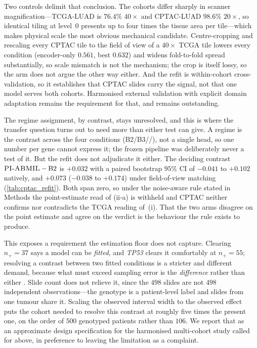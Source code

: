 Two controls delimit that conclusion. The cohorts differ sharply in scanner
magnification---TCGA-LUAD is $76.4\%$ $40\times$ and CPTAC-LUAD $98.6\%$
$20\times$, so identical tiling at level~$0$ presents up to four times the
tissue area per tile---which makes physical scale the most obvious mechanical
candidate. Centre-cropping and rescaling every CPTAC tile to the field of view
of a $40\times$ TCGA tile lowers every condition (encoder-only $0.561$, best
$0.632$) and widens fold-to-fold spread substantially, so scale mismatch is
not the mechanism; the crop is itself lossy, so the arm does not argue the
other way either. And the refit is within-cohort cross-validation, so it
establishes that CPTAC slides carry the signal, not that one model serves both
cohorts. Harmonised external validation with explicit domain adaptation
remains the requirement for that, and remains outstanding.

The regime assignment, by contrast, stays unresolved, and this is where the
transfer question turns out to need more than either test can give. A regime
is the contrast across the four conditions (B2/B3/\piabmil{}/\fcmil{}), not a
single head, so one number per gene cannot express it; the frozen pipeline was
deliberately never a test of it. But the refit does not adjudicate it either.
The deciding contrast $\textsc{PI-ABMIL}{}-\mathrm{B2}$ is $+0.032$ with a paired
bootstrap $95\%$ CI of $-0.041$ to $+0.102$ natively, and $+0.073$
($-0.038$ to $+0.174$) under field-of-view matching (\cref{tab:cptac_refit}).
Both span zero, so under the noise-aware rule stated in Methods the
point-estimate read of (ii-a) is withheld and CPTAC neither confirms nor
contradicts the TCGA reading of~(i). That the two arms disagree on the point
estimate and agree on the verdict is the behaviour the rule exists to produce.

This exposes a requirement the estimation floor does not capture. Clearing
$n_+\!=\!37$ says a model can be \emph{fitted}, and \textit{TP53} clears it
comfortably at $n_+\!=\!55$; resolving a contrast between two fitted
conditions is a stricter and different demand, because what must exceed
sampling error is the \emph{difference} rather than either \auroc{}. Slide
count does not relieve it, since the $498$ slides are not $498$ independent
observations---the genotype is a patient-level label and slides from one
tumour share it. Scaling the observed interval width to the observed effect
puts the cohort needed to resolve this contrast at roughly five times the
present one, on the order of $500$ genotyped patients rather than $106$. We
report that as an approximate design specification for the harmonised
multi-cohort study called for above, in preference to leaving the limitation
as a complaint.

